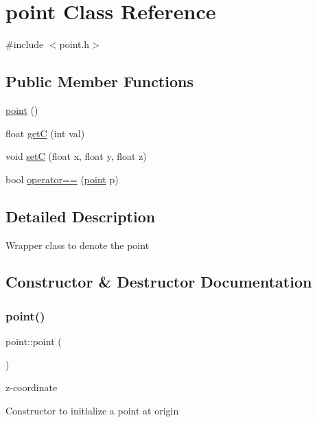 \hypertarget{classpoint}{}\section{point Class Reference}
\label{classpoint}


{\ttfamily \#include $<$point.\+h$>$}

\subsection*{Public Member Functions}
\begin{DoxyCompactItemize}
\item 
\hyperlink{classpoint_a5fe21d4a4539320bf0f5caf1218d31c8}{point} ()
\item 
float \hyperlink{classpoint_a042a11308d5c1d7e7605b30d8505fc97}{getC} (int val)
\item 
void \hyperlink{classpoint_ae40877ee3ed7560a4b58a681f68bdc2e}{setC} (float x, float y, float z)
\item 
bool \hyperlink{classpoint_a1b726e5c7b1c25647d685fe48d9a6e39}{operator==} (\hyperlink{classpoint}{point} p)
\end{DoxyCompactItemize}


\subsection{Detailed Description}
Wrapper class to denote the point 

\subsection{Constructor \& Destructor Documentation}
\mbox{\label{classpoint_a5fe21d4a4539320bf0f5caf1218d31c8}} 
\subsubsection{\texorpdfstring{point()}{point()}}
{\footnotesize\ttfamily point\+::point (\begin{DoxyParamCaption}{ }\end{DoxyParamCaption})\hspace{0.3cm}{\ttfamily [inline]}}

z-\/coordinate

Constructor to initialize a point at origin 

